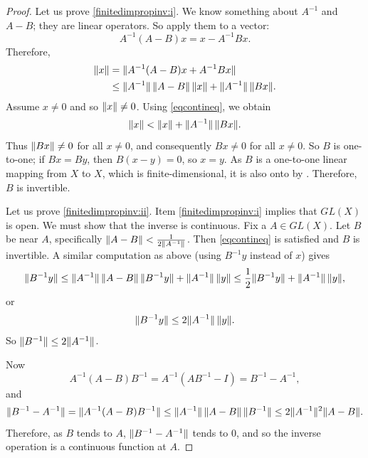 \begin{proof}
Let us prove \ref{finitedimpropinv:i}.   We know something about $A^{-1}$
and $A-B$; they are linear operators.
So apply them to a vector:
\begin{equation*}
A^{-1}(A-B)x
=
x-A^{-1}Bx .
\end{equation*}
Therefore,
\begin{equation*}
\begin{split}
\lVert {x} \rVert 
& =
\lVert {A^{-1} (A-B)x + A^{-1}Bx} \rVert
\\
& \leq
\lVert {A^{-1}} \rVert\,\lVert {A-B} \rVert\, \lVert {x} \rVert + \lVert {A^{-1}} \rVert\,\lVert {Bx} \rVert .
\end{split}
\end{equation*}
Assume $x \neq 0$ and so $\lVert {x} \rVert \neq 0$.
Using \eqref{eqcontineq}, we obtain
\begin{equation*}
\lVert {x} \rVert < \lVert {x} \rVert + \lVert {A^{-1}} \rVert \, \lVert {Bx} \rVert .
\end{equation*}
Thus $\lVert {Bx} \rVert \not= 0$ for all $x \not= 0$, and consequently
$Bx \not= 0$ for all $x \not= 0$.  So
$B$ is one-to-one; if $Bx = By$, then $B(x-y) = 0$, so $x=y$.
As $B$ is a one-to-one linear mapping from $X$ to $X$, which is finite-dimensional,
it is also onto by .
Therefore, $B$ is invertible.

Let us prove \ref{finitedimpropinv:ii}.
Item \ref{finitedimpropinv:i} implies that $GL(X)$ is open.
We must show that the inverse is continuous.
Fix a $A \in GL(X)$.  Let $B$ be near $A$,
specifically $\lVert {A-B} \rVert < \frac{1}{2 \lVert {A^{-1}} \rVert}$.
Then \eqref{eqcontineq} is satisfied and $B$ is invertible.
A similar computation as above (using $B^{-1}y$ instead of $x$) gives
\begin{equation*}
\lVert {B^{-1}y} \rVert \leq 
\lVert {A^{-1}} \rVert \, \lVert {A-B} \rVert \,  \lVert {B^{-1}y} \rVert + \lVert {A^{-1}} \rVert \, \lVert {y} \rVert
\leq
\frac{1}{2} \lVert {B^{-1}y} \rVert + \lVert {A^{-1}} \rVert\,\lVert {y} \rVert ,
\end{equation*}
or
\begin{equation*}
\lVert {B^{-1}y} \rVert \leq 
2\lVert {A^{-1}} \rVert\,\lVert {y} \rVert .
\end{equation*}
So
$
\lVert {B^{-1}} \rVert \leq 2 \lVert {A^{-1}} \rVert
$.

Now
\begin{equation*}
A^{-1}(A-B)B^{-1} = 
A^{-1}(AB^{-1}-I) = 
B^{-1}-A^{-1} ,
\end{equation*}
and
\begin{equation*}
\lVert {B^{-1}-A^{-1}} \rVert =
\lVert {A^{-1}(A-B)B^{-1}} \rVert \leq
\lVert {A^{-1}} \rVert\,\lVert {A-B} \rVert\,\lVert {B^{-1}} \rVert
\leq
2\lVert {A^{-1}} \rVert^2
\lVert {A-B} \rVert .
\end{equation*}
Therefore, as $B$ tends to $A$, $\lVert {B^{-1}-A^{-1}} \rVert$ tends to 0, and
so the inverse operation is a continuous function at $A$.
\end{proof}

